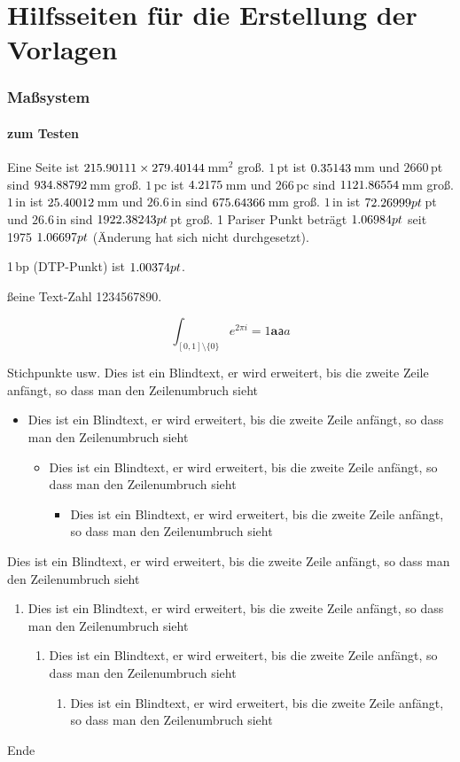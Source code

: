 \section{Hilfsseiten für die Erstellung der Vorlagen}

\begin{frame}
  \frametitle{Maßsystem}
  \framesubtitle{zum Testen}

  Eine Seite ist $\inmm\paperwidth\times\inmm{\paperheight}$\,mm${}^2$
  groß.  $1\,$pt ist $\inmm{1pt}$\,mm und $2660$\,pt sind
  $\inmm{2660pt}$\,mm groß.  $1\,$pc ist $\inmm{1pc}$\,mm und $266$\,pc
  sind $\inmm{266pc}$\,mm groß.  $1\,$in ist $\inmm{1in}$\,mm und
  $26.6$\,in sind $\inmm{26.6in}$\,mm groß.  $1\,$in ist
  $\inpt{1in}$\,pt und $26.6$\,in sind $\inpt{26.6in}$\,pt groß.  1
  Pariser Punkt beträgt $\inpt{0.376mm}$ seit 1975 $\inpt{0.375mm}$
  (Änderung hat sich nicht durchgesetzt).

  1\,bp (DTP-Punkt) ist $\inpt{1bp}$.

  \ss eine Text-Zahl 1234567890.

  \[
    \int_{[0,1]\setminus \{0\}} e^{2\pi i} = 1 \mathbf{a}\mathsf{a}{a}
  \]
  \edef\tempa{.36226328 * \the\tudbeamerlogoheight}
\end{frame}
\begin{frame}{Stichpunkte usw.}
  Dies ist ein Blindtext, er wird erweitert, bis die zweite
  Zeile anfängt, so dass man den Zeilenumbruch sieht
  \begin{itemize}
  \item
    Dies ist ein Blindtext, er wird erweitert, bis die zweite
    Zeile anfängt, so dass man den Zeilenumbruch sieht
    \begin{itemize}
    \item Dies ist ein Blindtext, er wird erweitert, bis die zweite
      Zeile anfängt, so dass man den Zeilenumbruch sieht
      \begin{itemize}
      \item Dies ist ein Blindtext, er wird erweitert, bis die zweite
        Zeile anfängt, so dass man den Zeilenumbruch sieht
      \end{itemize}
    \end{itemize}
  \end{itemize}
  Dies ist ein Blindtext, er wird erweitert, bis die zweite
  Zeile anfängt, so dass man den Zeilenumbruch sieht
  \begin{enumerate}
  \item   Dies ist ein Blindtext, er wird erweitert, bis die zweite
    Zeile anfängt, so dass man den Zeilenumbruch sieht
    \begin{enumerate}
    \item Dies ist ein Blindtext, er wird erweitert, bis die zweite
      Zeile anfängt, so dass man den Zeilenumbruch sieht
      \begin{enumerate}
      \item Dies ist ein Blindtext, er wird erweitert, bis die zweite
        Zeile anfängt, so dass man den Zeilenumbruch sieht
      \end{enumerate}
    \end{enumerate}
  \end{enumerate}
  Ende
\end{frame}
